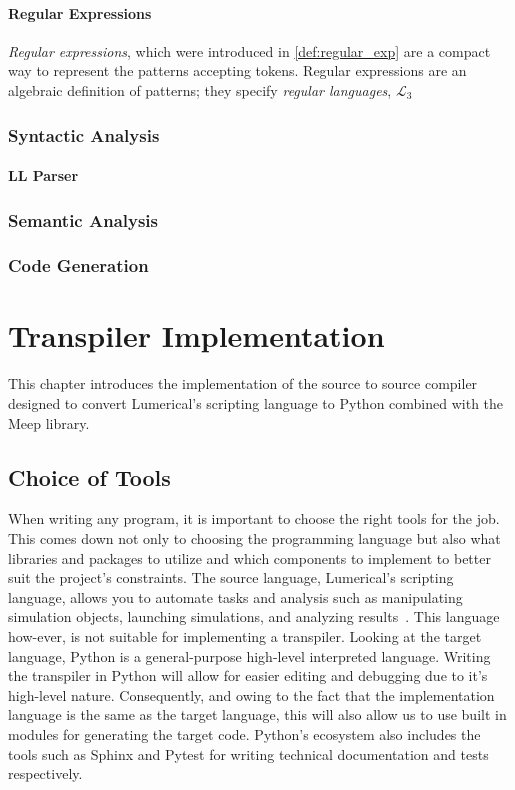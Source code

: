 

\subsubsection*{Regular Expressions}
\emph{Regular expressions}, which were introduced in \cref{def:regular_exp} are a compact way to represent the patterns accepting tokens. Regular expressions are an algebraic definition of patterns; they specify \emph{regular languages}, $\mathcal{L}_3$

\subsection*{Syntactic Analysis}

\subsubsection*{LL Parser}

\subsection*{Semantic Analysis}\label{sem-analysis}

\subsection*{Code Generation}


\chapter{Transpiler Implementation}
This chapter introduces the implementation of the source to source compiler designed to convert Lumerical's scripting language to Python combined with the Meep library. 
\section{Choice of Tools}
When writing any program, it is important to choose the right tools for the job. This comes down not only to choosing the programming language but also what libraries and packages to utilize and which components to implement to better suit the project's constraints. The source language, Lumerical's scripting language, allows you to automate tasks and analysis such as manipulating simulation objects, launching simulations, and analyzing results~\cite{ansys_lsf}. This language how-ever, is not suitable for implementing a transpiler. Looking at the target language, Python is a general-purpose high-level interpreted language. Writing the transpiler in Python will allow for easier editing and debugging due to it's high-level nature. Consequently, and owing to the fact that the implementation language is the same as the target language, this will also allow us to use built in modules for generating the target code. Python's ecosystem also includes the tools such as Sphinx and Pytest for writing technical documentation and tests respectively.

